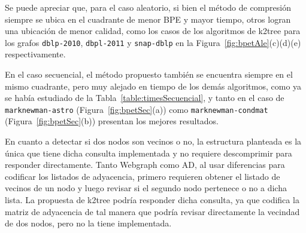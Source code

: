 Se puede apreciar que, para el caso aleatorio, si bien el método de compresión siempre se ubica en el cuadrante de menor BPE y mayor tiempo, otros logran una ubicación de menor calidad, como los casos de los algoritmos de k2tree para los grafos \texttt{dblp-2010}, \texttt{dbpl-2011} y \texttt{snap-dblp} en la Figura~\ref{fig:bpetAle}(c)(d)(e) respectivamente. 

En el caso secuencial, el método propuesto también se encuentra siempre en el mismo cuadrante, pero muy alejado en tiempo de los demás algoritmos, como ya se había estudiado de la Tabla~\ref{table:timesSecuencial}, y tanto en el caso de \texttt{marknewman-astro} (Figura~\ref{fig:bpetSec}(a)) como \texttt{marknewman-condmat} (Figura~\ref{fig:bpetSec}(b)) presentan los mejores resultados.

En cuanto a detectar si dos nodos son vecinos o no, la estructura planteada es la única que tiene dicha consulta implementada y no requiere descomprimir para responder directamente. Tanto Webgraph como AD, al usar diferencias para codificar los listados de adyacencia, primero requieren obtener el listado de vecinos de un nodo y luego revisar si el segundo nodo pertenece o no a dicha lista. La propuesta de k2tree podría responder dicha consulta, ya que codifica la matriz de adyacencia de tal manera que podría revisar directamente la vecindad de dos nodos, pero no la tiene implementada.

 
% 

%




%




